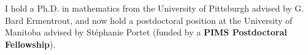 I hold a Ph.D. in mathematics from the University of Pittsburgh advised by G. Bard Ermentrout, and now hold a postdoctoral position at the University of Manitoba advised by St\'{e}phanie Portet (funded by a \textbf{PIMS Postdoctoral Fellowship}). %